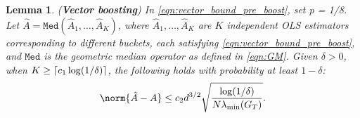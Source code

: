 \documentclass[letterpaper, 11 pt]{article}
\DeclarePairedDelimiter\ceil{\lceil}{\rceil}
\newtheorem{lemma}{Lemma}
\begin{document}
\begin{lemma} \label{lemma:vector_boosting} (\textbf{Vector boosting}) In \eqref{eqn:vector_bound_pre_boost}, set p = 1/8. Let $\hat{A} = \texttt{Med}(\hat{A}_1, \ldots, \hat{A}_K)$, where $\hat{A}_1, \ldots, \hat{A}_K$ are $K$ independent OLS estimators corresponding to different buckets, each satisfying \eqref{eqn:vector_bound_pre_boost}, and $\texttt{Med}$ is the geometric median operator as defined in \eqref{eqn:GM}. Given $\delta > 0$, when $K \geq \ceil{c_1 \log(1/\delta)}$, the following holds with probability at least $1 - \delta$:
\begin{equation}
    \norm{\hat{A} - A} \leq c_2 d^{3/2}\sqrt{\frac{\log(1/\delta)}{N \lambda_{\min}(G_T)}}.
    \label{eqn:vector_boosting_result}
\end{equation}
\end{lemma}
\end{document}
